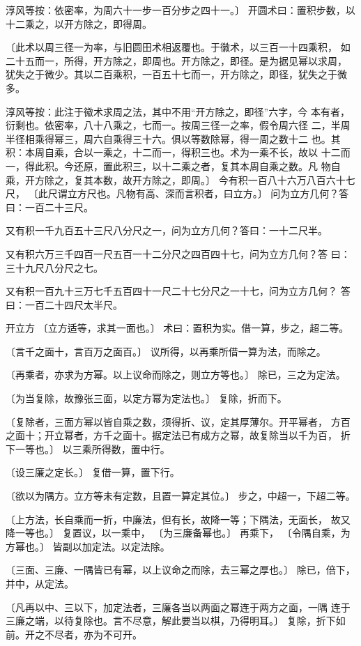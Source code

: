 \documentclass[a4paper,12pt,UTF8,twoside]{ctexbook}
\begin{document}
淳风等按：依密率，为周六十一步一百分步之四十一。〕 开圆术曰：置积步数，以十二乘之，以开方除之，即得周。

〔此术以周三径一为率，与旧圆田术相返覆也。于徽术，以三百一十四乘积， 如二十五而一，所得，开方除之，即周也。开方除之，即径。是为据见幂以求周， 犹失之于微少。其以二百乘积，一百五十七而一，开方除之，即径，犹失之于微 多。

淳风等按：此注于徽术求周之法，其中不用“开方除之，即径”六字，今 本有者，衍剩也。依密率，八十八乘之，七而一。按周三径一之率，假令周六径 二，半周半径相乘得幂三，周六自乘得三十六。俱以等数除幂，得一周之数十二 也。其积：本周自乘，合以一乘之，十二而一，得积三也。术为一乘不长，故以 十二而一，得此积。今还原，置此积三，以十二乘之者，复其本周自乘之数。凡 物自乘，开方除之，复其本数，故开方除之，即周。〕 今有积一百八十六万八百六十七尺， 〔此尺谓立方尺也。凡物有高、深而言积者，曰立方。〕 问为立方几何？答曰：一百二十三尺。

又有积一千九百五十三尺八分尺之一，问为立方几何？答曰：一十二尺半。

又有积六万三千四百一尺五百一十二分尺之四百四十七，问为立方几何？答 曰：三十九尺八分尺之七。

又有积一百九十三万七千五百四十一尺二十七分尺之一十七，问为立方几何？ 答曰：一百二十四尺太半尺。

开立方 〔立方适等，求其一面也。〕 术曰：置积为实。借一算，步之，超二等。

〔言千之面十，言百万之面百。〕 议所得，以再乘所借一算为法，而除之。

〔再乘者，亦求为方幂。以上议命而除之，则立方等也。〕 除已，三之为定法。

〔为当复除，故豫张三面，以定方幂为定法也。〕 复除，折而下。

〔复除者，三面方幂以皆自乘之数，须得折、议，定其厚薄尔。开平幂者， 方百之面十；开立幂者，方千之面十。据定法已有成方之幂，故复除当以千为百， 折下一等也。〕 以三乘所得数，置中行。

〔设三廉之定长。〕 复借一算，置下行。

〔欲以为隅方。立方等未有定数，且置一算定其位。〕 步之，中超一，下超二等。

〔上方法，长自乘而一折，中廉法，但有长，故降一等；下隅法，无面长， 故又降一等也。〕 复置议，以一乘中， 〔为三廉备幂也。〕 再乘下， 〔令隅自乘，为方幂也。〕 皆副以加定法。以定法除。

〔三面、三廉、一隅皆已有幂，以上议命之而除，去三幂之厚也。〕 除已，倍下，并中，从定法。

〔凡再以中、三以下，加定法者，三廉各当以两面之幂连于两方之面，一隅 连于三廉之端，以待复除也。言不尽意，解此要当以棋，乃得明耳。〕 复除，折下如前。开之不尽者，亦为不可开。
\end{document}
